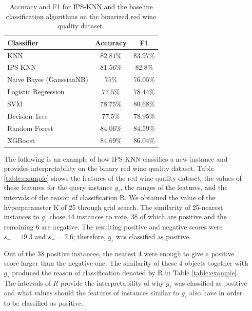 \documentclass[
]{ceurart}
\begin{document}
\begin{table}
\centering
    \caption{Accuracy and F1 for IPS-KNN and the baseline classification algorithms on the binarized red wine quality dataset.}
    \label{table:performance}
\begin{tabular}{lcc}
    \toprule
     \textbf{Classifier} & \textbf{Accuracy} & \textbf{F1} \\
    \midrule
    KNN & $82.81\%$ & $83.97\%$ \\
    IPS-KNN & $81.56\%$ & $82.8\%$ \\
    \midrule
    Naive Bayes (GaussianNB) & $75\%$ & $76.05\%$ \\
    Logistic Regression & $77.5\%$ & $78.44\%$ \\
    SVM & $78.75\%$ & $80.68\%$ \\
    Decision Tree & $77.5\%$ & $78.95\%$ \\
    Random Forest & $84.06\%$ & $84.59\%$ \\
    XGBoost & $84.69\%$ & $86.04\%$ \\
    \bottomrule
\end{tabular}
\end{table}


The following is an example of how IPS-KNN classifies a new instance and provides interpretability on the binary red wine quality dataset. Table \ref{table:example} shows the features of the red wine quality dataset, the values of these features for the query instance $g_\tau$, the ranges of the features, and the intervals of the reason of classification R. We obtained the value of the hyperparameter K of 25 through grid search. The similarity of 25-nearest instances to $g_\tau$ chose 44 instances to vote, 38 of which are positive and the remaining 6 are negative. The resulting positive and negative scores were $s_+ = 19.3$ and $s_-=2.6$; therefore, $g_\tau$ was classified as positive. 

Out of the 38 positive instances, the nearest 4 were enough to give a positive score larger than the negative one. The similarity of these 4 objects together with $g_\tau$ produced the reason of classification denoted by R in Table \ref{table:example}. The intervals of $R$ provide the interpretability of why $g_\tau$ was classified as positive and what values should the features of instances similar to $g_\tau$ also have in order to be classified as positive.
\end{document}
